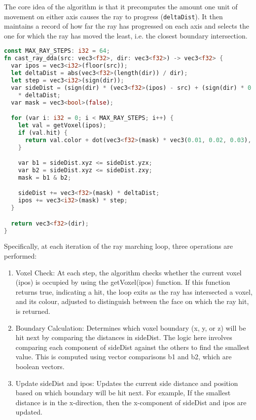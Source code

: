 The core idea of the algorithm is that it precomputes the amount one unit of movement on either axis causes the ray to progress (\texttt{deltaDist}). It then maintains a record of how far the ray has progressed on each axis and selects the one for which the ray has moved the least, i.e. the closest boundary intersection.

\begin{lstlisting}[language=rust, captionpos=b, caption={\texttt{DDA} algorithm}]
const MAX_RAY_STEPS: i32 = 64;
fn cast_ray_dda(src: vec3<f32>, dir: vec3<f32>) -> vec3<f32> {
  var ipos = vec3<i32>(floor(src));
  let deltaDist = abs(vec3<f32>(length(dir)) / dir);
  let step = vec3<i32>(sign(dir));
  var sideDist = (sign(dir) * (vec3<f32>(ipos) - src) + (sign(dir) * 0.5) + 0.5)
    * deltaDist;
  var mask = vec3<bool>(false);

  for (var i: i32 = 0; i < MAX_RAY_STEPS; i++) {
    let val = getVoxel(ipos);
    if (val.hit) {
      return val.color + dot(vec3<f32>(mask) * vec3(0.01, 0.02, 0.03), vec3(1.0));
    }

    var b1 = sideDist.xyz <= sideDist.yzx;
    var b2 = sideDist.xyz <= sideDist.zxy;
    mask = b1 & b2;

    sideDist += vec3<f32>(mask) * deltaDist;
    ipos += vec3<i32>(mask) * step;
  }

  return vec3<f32>(dir);
}
\end{lstlisting}

Specifically, at each iteration of the ray marching loop, three operations are performed:
\begin{enumerate}
  \item Voxel Check: At each step, the algorithm checks whether the current voxel (ipos) is occupied by using the getVoxel(ipos) function. If this function returns true, indicating a hit, the loop exits as the ray has intersected a voxel, and its colour, adjusted to distinguish between the face on which the ray hit, is returned.
  \item Boundary Calculation: Determines which voxel boundary (x, y, or z) will be hit next by comparing the distances in sideDist. The logic here involves comparing each component of sideDist against the others to find the smallest value. This is computed using vector comparisons b1 and b2, which are boolean vectors.
  \item Update sideDist and ipos: Updates the current side distance and position based on which boundary will be hit next. For example, If the smallest distance is in the x-direction, then the x-component of sideDist and ipos are updated.
\end{enumerate}

